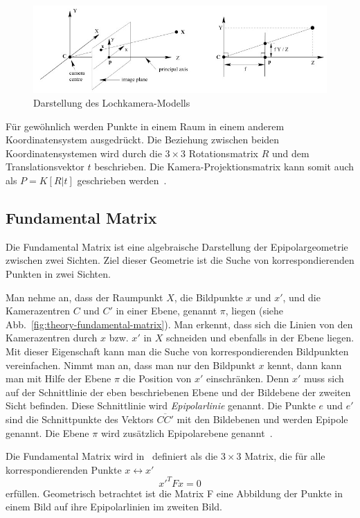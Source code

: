 \begin{figure}
    \centering
    \includegraphics[width=\textwidth]{src/img/hartley_2003_lochkamera.jpg}
    \caption{Darstellung des Lochkamera-Modells~\cite[Fig. 6.1]{hartley_2003}}
    \label{fig:theory-pinhole-camera}
\end{figure}


Für gewöhnlich werden Punkte in einem Raum in einem anderem Koordinatensystem ausgedrückt.
Die Beziehung zwischen beiden Koordinatensystemen wird durch die $3\times 3$ Rotationsmatrix $R$ und dem Translationsvektor $t$ beschrieben. 
Die Kamera-Projektionsmatrix kann somit auch als $P=K[R|t]$ geschrieben werden~\cite[Kapitel 6.1,S. 156, Gleichung 6.7]{hartley_2003}.


\subsection{Fundamental Matrix}\label{sec:fundamental-mat}
Die Fundamental Matrix ist eine algebraische Darstellung der Epipolargeometrie zwischen zwei Sichten.
Ziel dieser Geometrie ist die Suche von korrespondierenden Punkten in zwei Sichten.

Man nehme an, dass der Raumpunkt $X$, die Bildpunkte $x$ und $x'$, und die Kamerazentren $C$ und $C'$ in einer Ebene, genannt $\pi$, liegen (siehe Abb.~\ref{fig:theory-fundamental-matrix}).
Man erkennt, dass sich die Linien von den Kamerazentren durch $x$ bzw. $x'$ in $X$ schneiden und ebenfalls in der Ebene liegen.
Mit dieser Eigenschaft kann man die Suche von korrespondierenden Bildpunkten vereinfachen.
Nimmt man an, dass man nur den Bildpunkt $x$ kennt, dann kann man mit Hilfe der Ebene $\pi$ die Position von $x'$ einschränken.
Denn $x'$ muss sich auf der Schnittlinie der eben beschriebenen Ebene und der Bildebene der zweiten Sicht befinden. 
Diese Schnittlinie wird \emph{Epipolarlinie} genannt.
Die Punkte $e$ und $e'$ sind die Schnittpunkte des Vektors $\overline{CC'}$ mit den Bildebenen und werden Epipole genannt.
Die Ebene $\pi$ wird zusätzlich Epipolarebene genannt~\cite[Kapitel 9,1]{hartley_2003}.

Die Fundamental Matrix wird in~\cite[Kapitel 9.2]{hartley_2003} definiert als die $3\times 3$ Matrix, die für alle korrespondierenden Punkte $x \leftrightarrow x'$ 
\[ x'^TFx=0\] 
erfüllen.
Geometrisch betrachtet ist die Matrix F eine Abbildung der Punkte in einem Bild auf ihre Epipolarlinien im zweiten Bild.


